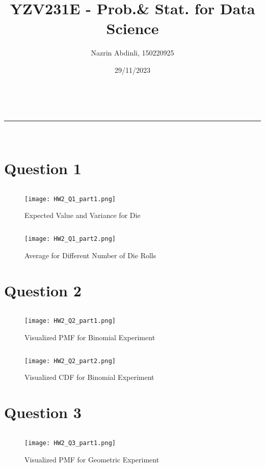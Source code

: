 \documentclass[a4paper,11pt]{article}
\makeatletter
\newcommand{\linia}{\rule{\linewidth}{0.5pt}}
\theoremstyle{mytheor}
\renewcommand{\maketitle}{
\begin{center}
\vspace{2ex}
{\huge \textsc{\@title}}
\vspace{1ex}
\\
\linia\\
\@author \hfill \@date
\vspace{4ex}
\end{center}
}
\makeatother
\begin{document}
\title{YZV231E - Prob.& Stat. for Data Science}

\author{Nazrin Abdinli, 150220925}

\date{29/11/2023}

\maketitle

\section*{Question 1}

\inputminted[breaklines]{python}{script_Q1_part1.py}
\begin{figure}[H]
    \centering
    \texttt{[image: HW2\_Q1\_part1.png]}
    \caption{Expected Value and Variance for Die}
    \label{fig:enter-label}
\end{figure}

\newpage
\inputminted[breaklines]{python}{script_Q1_part2.py}
\begin{figure}[H]
    \centering
    \texttt{[image: HW2\_Q1\_part2.png]}
    \caption{Average for Different Number of Die Rolls}
    \label{fig:enter-label}
\end{figure}

\newpage
\section*{Question 2}

\inputminted[breaklines]{python}{script_Q2_part1.py}
\begin{figure}[H]
    \centering
    \texttt{[image: HW2\_Q2\_part1.png]}
    \caption{Visualized PMF for Binomial Experiment}
    \label{fig:enter-label}
\end{figure}

\newpage
\inputminted[breaklines]{python}{script_Q2_part2.py}
\begin{figure}[H]
    \centering
    \texttt{[image: HW2\_Q2\_part2.png]}
    \caption{Visualized CDF for Binomial Experiment}
    \label{fig:enter-label}
\end{figure}

\newpage
\section*{Question 3}
\inputminted[breaklines]{python}{script_Q3_part1.py}
\begin{figure}[H]
    \centering
    \texttt{[image: HW2\_Q3\_part1.png]}
    \caption{Visualized PMF for Geometric Experiment}
    \label{fig:enter-label}
\end{figure}
\end{document}
